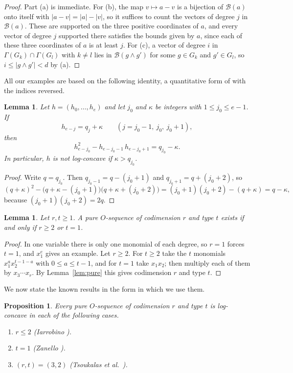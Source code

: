 \documentclass{amsart}
\newtheorem{proposition}[theorem]{Proposition}
\newtheorem{lemma}[theorem]{Lemma}
\theoremstyle{definition}
\theoremstyle{remark}
\newcommand{\B}{\mathcal{B}}
\begin{document}
\begin{proof}
Part (a) is immediate. For (b), the map $v\mapsto a-v$ is a bijection of $\B(a)$ onto itself with $|a-v|=|a|-|v|$, so it suffices to count the vectors of degree $j$ in $\B(a)$. These are supported on the three positive coordinates of $a$, and every vector of degree $j$ supported there satisfies the bounds given by $a$, since each of these three coordinates of $a$ is at least $j$. For (c), a vector of degree $i$ in $\Gamma(G_k)\cap\Gamma(G_l)$ with $k\ne l$ lies in $\B(g\wedge g')$ for some $g\in G_k$ and $g'\in G_l$, so $i\le|g\wedge g'|<d$ by (a).
\end{proof}

All our examples are based on the following identity, a quantitative form of \cite[Lemma~3]{Za} with the indices reversed.

\begin{lemma}\label{lem:identity}
Let $h=(h_0,\dots,h_e)$ and let $j_0$ and $\kappa$ be integers with $1\le j_0\le e-1$. If
\[
h_{e-j}=q_j+\kappa\qquad (j=j_0-1,\ j_0,\ j_0+1),
\]
then
\[
h_{e-j_0}^2-h_{e-j_0-1}\,h_{e-j_0+1}=q_{j_0}-\kappa.
\]
In particular, $h$ is not log-concave if $\kappa>q_{j_0}$.
\end{lemma}

\begin{proof}
Write $q=q_{j_0}$. Then $q_{j_0-1}=q-(j_0+1)$ and $q_{j_0+1}=q+(j_0+2)$, so
\[
(q+\kappa)^2-\bigl(q+\kappa-(j_0+1)\bigr)\bigl(q+\kappa+(j_0+2)\bigr)=(j_0+1)(j_0+2)-(q+\kappa)=q-\kappa,
\]
because $(j_0+1)(j_0+2)=2q$.
\end{proof}

\begin{lemma}\label{lem:feasible}
Let $r,t\ge 1$. A pure $O$-sequence of codimension $r$ and type $t$ exists if and only if $r\ge 2$ or $t=1$.
\end{lemma}

\begin{proof}
In one variable there is only one monomial of each degree, so $r=1$ forces $t=1$, and $x_1^e$ gives an example. Let $r\ge 2$. For $t\ge 2$ take the $t$ monomials $x_1^{a}x_2^{t-1-a}$ with $0\le a\le t-1$, and for $t=1$ take $x_1x_2$; then multiply each of them by $x_3\cdots x_r$. By Lemma~\ref{lem:pure} this gives codimension $r$ and type $t$.
\end{proof}

We now state the known results in the form in which we use them.

\begin{proposition}\label{prop:known-positive}
Every pure $O$-sequence of codimension $r$ and type $t$ is log-concave in each of the following cases.
\begin{enumerate}
\item[(a)] $r\le 2$ \textup{(Iarrobino \cite[Proposition~4.3(i)]{Ia})}.
\item[(b)] $t=1$ \textup{(Zanello \cite[Proposition~7]{Za})}.
\item[(c)] $(r,t)=(3,2)$ \textup{(Tsoukalas et al.\ \cite[Appendix~B.4]{TKS})}.
\end{enumerate}
\end{proposition}
\end{document}
